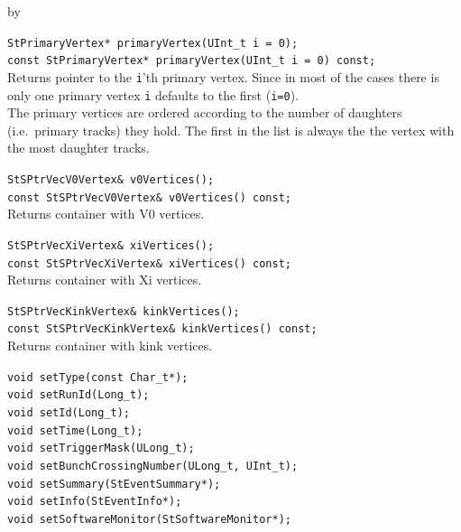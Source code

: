 \documentclass[twoside]{article}
\newcommand{\entrylabel}[1]{\mbox{\textbf{{#1}}}\hfil}%
\newenvironment{entry}
{\begin{list}{}%
    {\renewcommand{\makelabel}{\entrylabel}%
     \setlength{\labelwidth}{90pt}%
     \setlength{\leftmargin}{\labelwidth}
     \advance\leftmargin by \labelsep%
      }%
    }%
  {\end{list}}
\newcommand{\Entrylabel}[1]%
{\raisebox{0pt}[1ex][0pt]{\makebox[\labelwidth][l]%
    {\parbox[t]{\labelwidth}{\hspace{0pt}\textbf{{#1}}}}}}
\newenvironment{Entry}%
{\renewcommand{\entrylabel}{\Entrylabel}\begin{entry}}%
  {\end{entry}}
\begin{document}
\begin{Entry}
    \verb+StPrimaryVertex* primaryVertex(UInt_t i = 0);+\\
    \verb+const StPrimaryVertex* primaryVertex(UInt_t i = 0) const;+\\
    Returns pointer to the \texttt{i}'th primary vertex.  Since in
    most of the cases there is only one primary vertex \texttt{i}
    defaults to the first (\texttt{i=0}).\\
    The primary vertices are ordered according to the number of daughters
    (i.e.~primary tracks) they hold. The first in the list is always the
    the vertex with the most daughter tracks.
    
    \verb+StSPtrVecV0Vertex& v0Vertices();+\\
    \verb+const StSPtrVecV0Vertex& v0Vertices() const;+\\
    Returns container with V0 vertices.
    
    \verb+StSPtrVecXiVertex& xiVertices();+\\
    \verb+const StSPtrVecXiVertex& xiVertices() const;+\\
    Returns container with Xi vertices.
    
    \verb+StSPtrVecKinkVertex& kinkVertices();+\\
    \verb+const StSPtrVecKinkVertex& kinkVertices() const;+\\
    Returns container with kink vertices.
    
    \verb+void setType(const Char_t*);+\\

    \verb+void setRunId(Long_t);+\\

    \verb+void setId(Long_t);+\\

    \verb+void setTime(Long_t);+\\

    \verb+void setTriggerMask(ULong_t);+\\

    \verb+void setBunchCrossingNumber(ULong_t, UInt_t);+\\

    \verb+void setSummary(StEventSummary*);+\\

    \verb+void setInfo(StEventInfo*);+\\

    \verb+void setSoftwareMonitor(StSoftwareMonitor*);+\\


\end{Entry}
\end{document}
